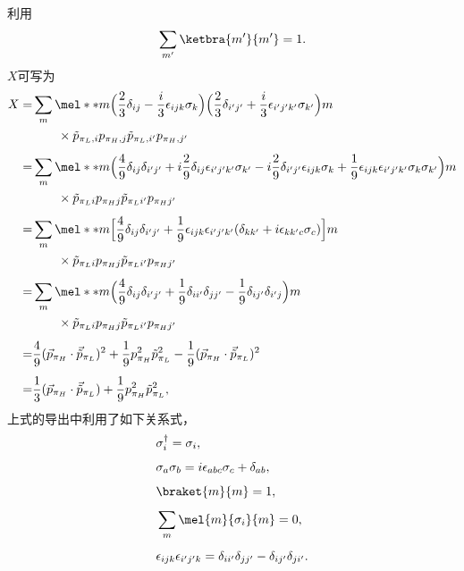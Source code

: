 利用
\begin{equation}
	\sum_{m'}\ketbra{m'}{m'}=1.
\end{equation}
\newpage
$X$可写为
\begin{equation}
\label{eq3a8}
\begin{aligned}[b]
	X=&\sum_{m}\mel**{m}{\Big(\frac{2}{3}\delta_{ij}-\frac{i}{3}\epsilon_{ijk}\sigma_{k}\Big)\Big(\frac{2}{3}\delta_{i'j'}+\frac{i}{3}\epsilon_{i'j'k'}\sigma_{k'}\Big)}{m}\\
		    &\qquad\times\tilde{p}_{\pi_{L},i}p_{\pi_{H},j}\tilde{p}_{\pi_{L},i'}p_{\pi_{H},j'}\\[1ex]
	=&\sum_{m}\mel**{m}{\Big(\frac{4}{9}\delta_{ij}\delta_{i'j'}+i\frac{2}{9}\delta_{ij}\epsilon_{i'j'k'}\sigma_{k'}-i\frac{2}{9}\delta_{i'j'}\epsilon_{ijk}\sigma_{k}+\frac{1}{9}\epsilon_{ijk}\epsilon_{i'j'k'}\sigma_{k}\sigma_{k'}\Big)}{m}\\
	 &\qquad\times\tilde{p}_{\pi_{L}i}p_{\pi_{H}j}\tilde{p}_{\pi_{L}i'}p_{\pi_{H}j'}\\[1ex]
	=&\sum_{m}\mel**{m}{\Big[\frac{4}{9}\delta_{ij}\delta_{i'j'}+\frac{1}{9}\epsilon_{ijk}\epsilon_{i'j'k'}(\delta_{kk'}+i\epsilon_{kk'c}\sigma_{c})\Big]}{m}\\
	 &\qquad\times\tilde{p}_{\pi_{L}i}p_{\pi_{H}j}\tilde{p}_{\pi_{L}i'}p_{\pi_{H}j'}\\[1ex]
	=&\sum_{m}\mel**{m}{\Big(\frac{4}{9}\delta_{ij}\delta_{i'j'}+\frac{1}{9}\delta_{ii'}\delta_{jj'}-\frac{1}{9}\delta_{ij'}\delta_{i'j}\Big)}{m}\\
	 &\qquad\times\tilde{p}_{\pi_{L}i}p_{\pi_{H}j}\tilde{p}_{\pi_{L}i'}p_{\pi_{H}j'}\\[1ex]
	=&\frac{4}{9}(\vec{p}_{\pi_{H}}\cdot \vec{\tilde{p}}_{\pi_{L}})^2+\frac{1}{9}p_{\pi_{H}}^2\tilde{p}_{\pi_{L}}^2-\frac{1}{9}(\vec{p}_{\pi_{H}}\cdot \vec{\tilde{p}}_{\pi_{L}})^2\\[1ex]
	=&\frac{1}{3}(\vec{p}_{\pi_{H}}\cdot \vec{\tilde{p}}_{\pi_{L}})+\frac{1}{9}p_{\pi_{H}}^2\tilde{p}_{\pi_{L}}^2,
\end{aligned}
\end{equation}
上式的导出中利用了如下关系式，
\begin{align}
	&\sigma_{i}^{\dagger}=\sigma_{i},\\[1ex]
	&\sigma_{a}\sigma_{b}=i\epsilon_{abc}\sigma_{c}+\delta_{ab},\\[1ex]
	&\braket{m}{m}=1,\\[1ex]
	&\sum_{m}\mel{m}{\sigma_{i}}{m}=0,\\[1ex]
	&\epsilon_{ijk}\epsilon_{i'j'k}=\delta_{ii'}\delta_{jj'}-\delta_{ij'}\delta_{ji'}.
\end{align}
